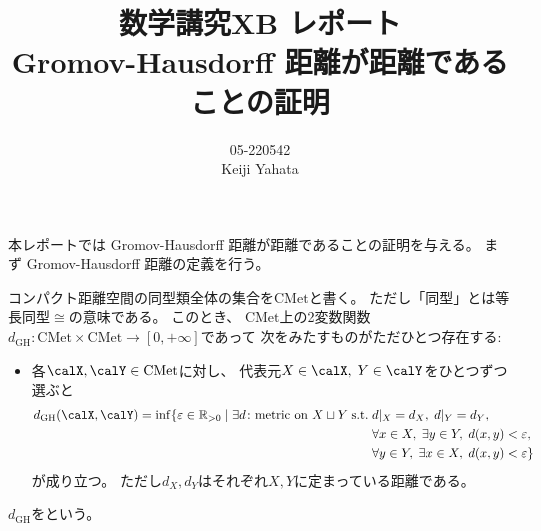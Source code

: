 \documentclass[report, notitlepage]{jlreq}
\title{数学講究XB レポート \\[1ex] Gromov-Hausdorff 距離が距離であることの証明}
\author{05-220542 \\ Keiji Yahata}
\date{}
\newcommand{\CMet}{\mathrm{CMet}}
\newcommand{\GH}{\mathrm{GH}}
\begin{document}
\maketitle

%
\newpage
\setcounter{section}{1}

本レポートでは Gromov-Hausdorff 距離が距離であることの証明を与える。
まず Gromov-Hausdorff 距離の定義を行う。

\begin{propdef}
    コンパクト距離空間の同型類全体の集合を$\CMet$と書く。
    ただし「同型」とは等長同型$\cong$の意味である。
    このとき、
    $\CMet$上の2変数関数
    $d_\GH \colon \CMet \times \CMet \to [0, +\infty]$であって
    次をみたすものがただひとつ存在する:
    \begin{itemize}
        \item 各$\calX, \calY \in \CMet$に対し、
            代表元$X \in \calX, \; Y \in \calY$をひとつずつ選ぶと
            \begin{equation}
                \label{eq:def}
                \begin{alignedat}{2}
                    d_\GH(\calX, \calY)
                        =
                            \inf \{
                                \eps \in \R_{> 0}
                                \mid
                                \exists d \colon \text{metric on $X \sqcup Y$}
                                \; \text{s.t.} \;
                                &d|_X = d_X, \; d|_Y = d_Y,
                                    \\
                                &\forall x \in X, \;
                                    \exists y \in Y, \;
                                    d(x, y) < \eps, \;
                                    \\
                                &\forall y \in Y, \;
                                    \exists x \in X, \;
                                    d(x, y) < \eps
                            \}
                \end{alignedat}
            \end{equation}
            が成り立つ。
            ただし$d_X, d_Y$はそれぞれ$X, Y$に定まっている距離である。
    \end{itemize}
    $d_\GH$をという。
\end{propdef}
\end{document}
